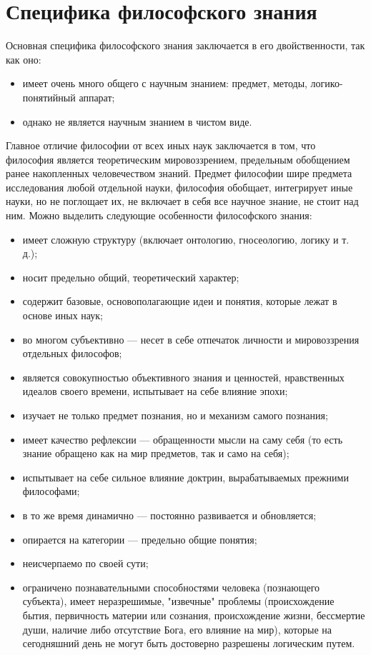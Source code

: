 \documentclass[12pt]{article}
\begin{document}
\section{Специфика философского знания}
Основная специфика философского знания заключается в его двойственности, так как оно:
\begin{itemize}
  \item имеет очень много общего с научным знанием: предмет, методы, логико-понятийный аппарат;
  \item однако не является научным знанием в чистом виде.
\end{itemize}
Главное отличие философии от всех иных наук заключается в том, что философия является теоретическим
мировоззрением, предельным обобщением ранее накопленных человечеством знаний.
Предмет философии шире предмета исследования любой отдельной науки, философия обобщает, интегрирует
иные науки, но не поглощает их, не включает в себя все научное знание, не стоит над ним.
Можно выделить следующие особенности философского знания:
\begin{itemize}
\item имеет сложную структуру (включает онтологию, гносеологию, логику и т. д.);
\item носит предельно общий, теоретический характер;
\item содержит базовые, основополагающие идеи и понятия, которые лежат в основе иных наук;
\item во многом субъективно — несет в себе отпечаток личности и мировоззрения отдельных философов;
\item  является  совокупностью  объективного  знания  и  ценностей,  нравственных  идеалов  своего  времени,
испытывает на себе влияние эпохи;
\item изучает не только предмет познания, но и механизм самого познания;
\item  имеет  качество  рефлексии  —  обращенности  мысли  на  саму  себя  (то  есть  знание  обращено  как  на  мир
предметов, так и само на себя);
\item испытывает на себе сильное влияние доктрин, вырабатываемых прежними философами;
\item в то же время динамично — постоянно развивается и обновляется;
\item опирается на категории — предельно общие понятия;
\item неисчерпаемо по своей сути;
\item  ограничено  познавательными  способностями  человека  (познающего  субъекта),  имеет  неразрешимые,
"извечные"  проблемы  (происхождение  бытия,  первичность  материи  или  сознания,  происхождение  жизни,
бессмертие души, наличие либо отсутствие Бога, его влияние на мир), которые на сегодняшний день не могут
быть достоверно разрешены логическим путем.
\end{itemize}
\end{document}
